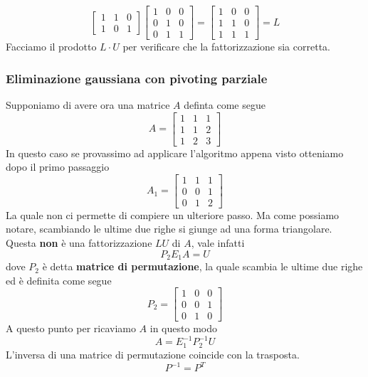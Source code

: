 \begin{example}
\[\begin{bmatrix}
			1 & 1 & 0 \\
			1 & 0 & 1
		\end{bmatrix} \begin{bmatrix}
			1 & 0 & 0 \\
			0 & 1 & 0 \\
			0 & 1 & 1
		\end{bmatrix} = \begin{bmatrix}
			1 & 0 & 0 \\
			1 & 1 & 0 \\
			1 & 1 & 1
		\end{bmatrix} = L
	\]
	Facciamo il prodotto $L \cdot U$ per verificare che la fattorizzazione sia corretta.
\end{example}

\subsubsection{Eliminazione gaussiana con pivoting parziale}
Supponiamo di avere ora una matrice $A$ definta come segue
\[
	A = \begin{bmatrix}
		1 & 1 & 1 \\
		1 & 1 & 2 \\
		1 & 2 & 3
	\end{bmatrix}
\]
In questo caso se provassimo ad applicare l'algoritmo appena visto otteniamo dopo il primo passaggio
\[
	A_1 = \begin{bmatrix}
		1 & 1 & 1 \\
		0 & 0 & 1 \\
		0 & 1 & 2
	\end{bmatrix}
\]
La quale non ci permette di compiere un ulteriore passo. Ma come possiamo notare, scambiando le ultime due righe
si giunge ad una forma triangolare. Questa \textbf{non} è una fattorizzazione $LU$ di $A$, vale infatti
\[ P_2 E_1 A = U \]
dove $P_2$ è detta \textbf{matrice di permutazione}, la quale scambia le ultime due righe ed è definita come
segue
\[
	P_2 = \begin{bmatrix}
		1 & 0 & 0 \\
		0 & 0 & 1 \\
		0 & 1 & 0
	\end{bmatrix}
\]
A questo punto per ricaviamo $A$ in questo modo
\[ A = E_1^{-1} P_2^{-1} U \]
L'inversa di una matrice di permutazione coincide con la trasposta.
\[ P^{-1} = P^T \]

